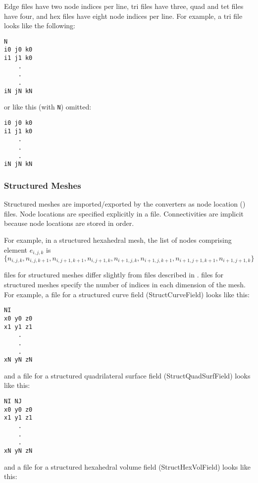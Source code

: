 Edge files have two node indices per line, tri files have three, quad
and tet files have four, and hex files have eight node indices per
line.  For example, a tri file looks like the following:

\begin{verbatim}
N
i0 j0 k0
i1 j1 k0
    .
    .
    .
iN jN kN
\end{verbatim}

or like this (with \verb|N|) omitted:

\begin{verbatim}
i0 j0 k0
i1 j1 k0
    .
    .
    .
iN jN kN
\end{verbatim}

\subsubsection{Structured Meshes}

Structured meshes are imported/exported by the converters as node
location () files.  Node locations are specified explicitly in a
 file. Connectivities are implicit because node locations are
stored in  order.

For example, in a structured hexahedral mesh, the list of nodes comprising
element \(e_{i,j,k}\) is \(\{n_{i,j,k}, n_{i,j,k+1}, n_{i,j+1,k+1}, n_{i,j+1,k}, n_{i+1,j,k}, n_{i+1,j,k+1}, n_{i+1,j+1,k+1}, n_{i+1,j+1,k}\}\)

 files for structured meshes differ slightly
from  files described in .   files for
structured meshes specify the number of indices in each dimension of the
mesh.  For example, a  file for a structured curve field
(StructCurveField) looks like this:

\begin{verbatim}
NI
x0 y0 z0
x1 y1 z1
    .
    .
    .
xN yN zN
\end{verbatim}

and a  file for a structured quadrilateral surface field
(StructQuadSurfField) looks like this:

\begin{verbatim}
NI NJ
x0 y0 z0
x1 y1 z1
    .
    .
    .
xN yN zN
\end{verbatim}

and a  file for a structured hexahedral volume field
(StructHexVolField) looks like this:

